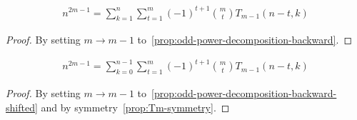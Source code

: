 \begin{corollary}
    \label{cor:odd-power-decomposition-m-1}
    \begin{align*}
        n^{2m-1} = \sum_{k=1}^{n} \sum_{t=1}^{m} (-1)^{t+1} \binom{m}{t} T_{m-1} (n-t, k)
    \end{align*}
    \begin{proof}
        By setting $m \rightarrow m-1$ to~\eqref{prop:odd-power-decomposition-backward}.
    \end{proof}
\end{corollary}

\begin{corollary}
    \label{cor:odd-power-decomposition-m-1-shifted}
    \begin{align*}
        n^{2m-1} = \sum_{k=0}^{n-1} \sum_{t=1}^{m} (-1)^{t+1} \binom{m}{t} T_{m-1} (n-t, k)
    \end{align*}
    \begin{proof}
        By setting $m \rightarrow m-1$ to~\eqref{prop:odd-power-decomposition-backward-shifted}
        and by symmetry~\eqref{prop:Tm-symmetry}.
    \end{proof}
\end{corollary}
